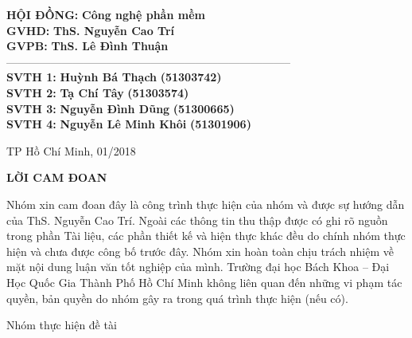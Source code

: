 \documentclass[a4paper,12pt,oneside]{article}
\begin{document}
{\fontsize{13pt}{1}
\begin{tabbing}

\hspace*{5cm} \= \textbf{HỘI ĐỒNG:} \hspace*{0.01cm} \= \textbf{Công nghệ phần mềm} \\
\> \textbf{GVHD:} \> \textbf{ThS. Nguyễn Cao Trí}\\
\> \textbf{GVPB:} \> \textbf{ThS. Lê Đình Thuận}\\
\> -----------------------------------------------------------------------------\\
\> \textbf{SVTH 1:} \> \textbf{Huỳnh Bá Thạch} \hspace*{1cm} \= \textbf{(51303742)}\\
\> \textbf{SVTH 2:} \> \textbf{Tạ Chí Tây} \> \textbf{(51303574)}\\
\> \textbf{SVTH 3:} \> \textbf{Nguyễn Đình Dũng} \> \textbf{(51300665)}\\
\> \textbf{SVTH 4:} \> \textbf{Nguyễn Lê Minh Khôi} \> \textbf{(51301906)}\\
\end{tabbing}
}

\vspace{\fill}
\begin{center}
{\fontsize{20pt}{1} TP Hồ Chí Minh, 01/2018}\\
\end{center}
\ClearShipoutPicture

\newpage

\begin{center}
{\fontsize{20pt}{1}\selectfont \textbf{LỜI CAM ĐOAN}}\\[1cm]
\end{center}
Nhóm xin cam đoan đây là công trình thực hiện của nhóm và được sự hướng dẫn của ThS. Nguyễn Cao Trí. Ngoài các thông tin thu thập được có ghi rõ nguồn trong phần Tài liệu, các phần thiết kế và hiện thực khác đều do chính nhóm thực hiện và chưa được công bố trước đây. Nhóm xin hoàn toàn chịu trách nhiệm về mặt nội dung luận văn tốt nghiệp của mình. Trường đại học Bách Khoa – Đại Học
Quốc Gia Thành Phố Hồ Chí Minh không liên quan đến những vi phạm tác quyền,
bản quyền do nhóm gây ra trong quá trình thực hiện (nếu có).
\begin{flushright}
Nhóm thực hiện đề tài
\end{flushright}
\end{document}
